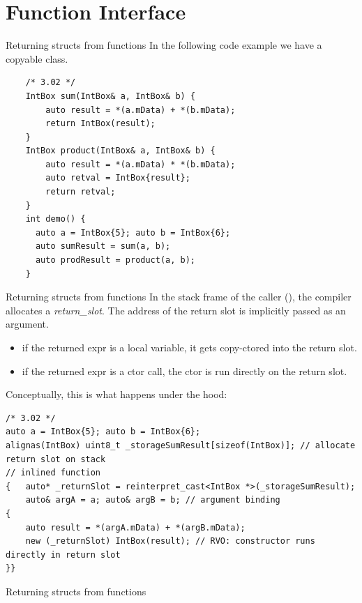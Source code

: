 \section{Function Interface}

\begin{frame}[fragile]{Returning structs from functions}
  In the following code example we have a copyable  class.\\

  \begin{verbatim}
    /* 3.02 */
    IntBox sum(IntBox& a, IntBox& b) {
        auto result = *(a.mData) + *(b.mData);
        return IntBox(result);
    }
    IntBox product(IntBox& a, IntBox& b) {
        auto result = *(a.mData) * *(b.mData);
        auto retval = IntBox{result};
        return retval;
    }
    int demo() {
      auto a = IntBox{5}; auto b = IntBox{6};
      auto sumResult = sum(a, b);
      auto prodResult = product(a, b);
    }
  \end{verbatim}
\end{frame}

\begin{frame}[fragile]{Returning structs from functions}
  In the stack frame of the caller (), the compiler allocates a \emph{return\_slot}.
  The address of the return slot is implicitly passed as an argument.
  \begin{itemize}
    \item if the returned expr is a local variable, it gets copy-ctored into the return slot.
    \item if the returned expr is a ctor call, the ctor is run directly on the return slot.
  \end{itemize}

  Conceptually, this is what happens under the hood:
  \begin{verbatim}
/* 3.02 */
auto a = IntBox{5}; auto b = IntBox{6};
alignas(IntBox) uint8_t _storageSumResult[sizeof(IntBox)]; // allocate return slot on stack
// inlined function
{   auto* _returnSlot = reinterpret_cast<IntBox *>(_storageSumResult);
    auto& argA = a; auto& argB = b; // argument binding
{
    auto result = *(argA.mData) + *(argB.mData);
    new (_returnSlot) IntBox(result); // RVO: constructor runs directly in return slot
}}
  \end{verbatim}
\end{frame}

\begin{frame}[fragile]{Returning structs from functions}
  
\end{frame}

